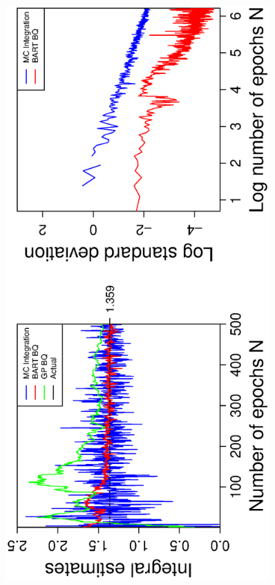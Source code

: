 \vspace{-0.5cm}
\begin{figure}[H]
  \centering
  \hspace{-1.2cm}
  \begin{minipage}[b]{0.4\textwidth}
    \includegraphics[width = 0.9\textwidth, angle = -90]{report/Figures/3/convergenceMean35Dimensions.eps}

\end{minipage}
\end{figure}
